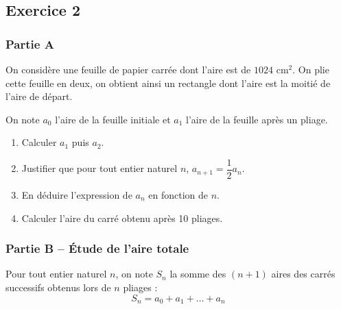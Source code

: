\documentclass[a4paper,12pt]{article}
\begin{document}
\newpage

\subsection*{Exercice 2}

\subsubsection*{Partie A}

On considère une feuille de papier carrée dont l'aire est de $1024$ cm$^2$. On plie cette feuille en deux, on obtient ainsi un rectangle dont l'aire est la moitié de l'aire de départ.

\begin{center}
\end{center}

On note $a_0$ l'aire de la feuille initiale et $a_1$ l'aire de la feuille après un pliage.

\begin{enumerate}
\item Calculer $a_1$ puis $a_2$.
\item Justifier que pour tout entier naturel $n$, $a_{n+1} = \dfrac{1}{2} a_n$.
\item En déduire l'expression de $a_n$ en fonction de $n$.
\item Calculer l'aire du carré obtenu après 10 pliages.
\end{enumerate}

\subsubsection*{Partie B -- Étude de l'aire totale}

Pour tout entier naturel $n$, on note $S_n$ la somme des $(n+1)$ aires des carrés successifs obtenus lors de $n$ pliages :
\[
S_n = a_0 + a_1 + \ldots + a_n
\]
\end{document}
